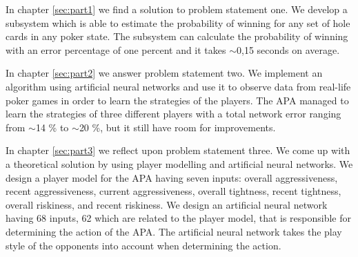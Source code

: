 In chapter \ref{sec:part1} we find a solution to problem statement one. We develop a subsystem which is able to estimate the probability of winning for any set of hole cards in any poker state. The subsystem can calculate the probability of winning with an error percentage of one percent and it takes $\sim$0,15 seconds on average.

In chapter \ref{sec:part2} we answer problem statement two. We implement an algorithm using artificial neural networks and use it to observe data from real-life poker games in order to learn the strategies of the players. The APA managed to learn the strategies of three different players with a total network error ranging from $\sim$14 \% to $\sim$20 \%, but it still have room for improvements.

In chapter \ref{sec:part3} we reflect upon problem statement three. We come up with a theoretical solution by using player modelling and artificial neural networks. We design a player model for the APA having seven inputs: overall aggressiveness, recent aggressiveness, current aggressiveness, overall tightness, recent tightness, overall riskiness, and recent riskiness. 
We design an artificial neural network having 68 inputs, 62 which are related to the player model, that is responsible for determining the action of the APA. The artificial neural network takes the play style of the opponents into account when determining the action.
